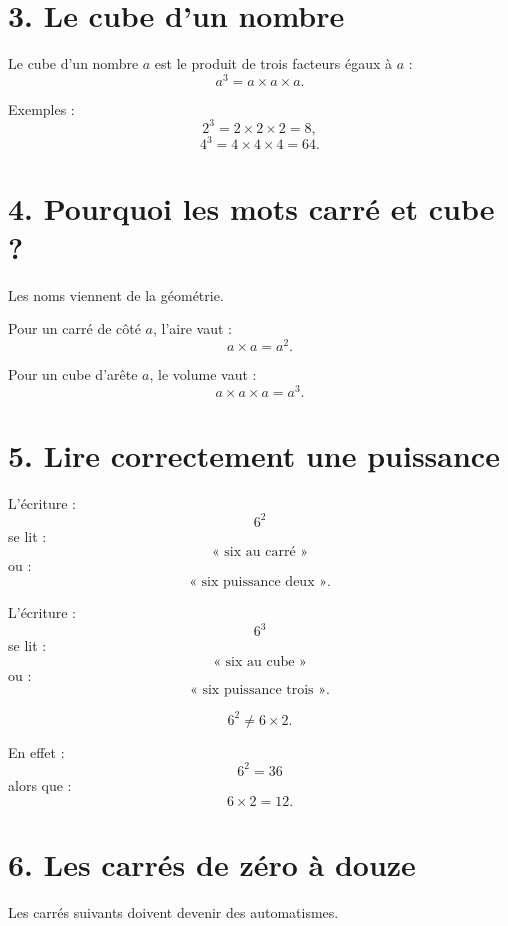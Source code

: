 \section{3. Le cube d'un nombre}

\begin{definition}
Le cube d'un nombre $a$ est le produit de trois facteurs égaux à $a$ :
\[
\boxed{a^3=a\times a\times a}.
\]
\end{definition}

Exemples :
\[
2^3=2\times2\times2=8,
\]
\[
4^3=4\times4\times4=64.
\]

\section{4. Pourquoi les mots carré et cube ?}

Les noms viennent de la géométrie.


Pour un carré de côté $a$, l'aire vaut :
\[
a\times a=a^2.
\]

Pour un cube d'arête $a$, le volume vaut :
\[
a\times a\times a=a^3.
\]

\section{5. Lire correctement une puissance}

L'écriture :
\[
6^2
\]
se lit :
\[
\text{« six au carré »}
\]
ou :
\[
\text{« six puissance deux »}.
\]

L'écriture :
\[
6^3
\]
se lit :
\[
\text{« six au cube »}
\]
ou :
\[
\text{« six puissance trois »}.
\]

\begin{attention}
\[
6^2\neq6\times2.
\]

En effet :
\[
6^2=36
\]
alors que :
\[
6\times2=12.
\]
\end{attention}

\section{6. Les carrés de zéro à douze}

Les carrés suivants doivent devenir des automatismes.

